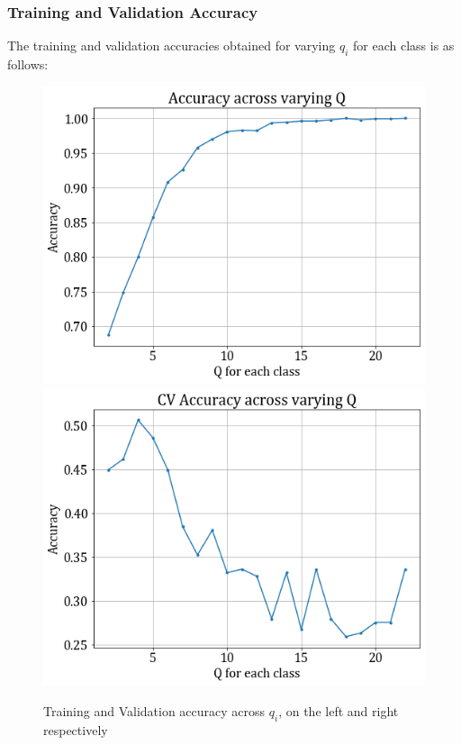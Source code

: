 \documentclass[11pt,a4paper]{article}
\begin{document}
\subsubsection{Training and Validation Accuracy}
The training and validation accuracies obtained for varying $q_i$ for each class is as follows:
\begin{figure}[H]
    \hspace{-2em}
    \includegraphics[scale=0.5]{images/2A/2a_full_train_acc.png}
    \includegraphics[scale=0.5]{images/2A/2a_full_val_acc.png}
    \caption{Training and Validation accuracy across $q_i$, on the left and right respectively}
\end{figure}
\end{document}
